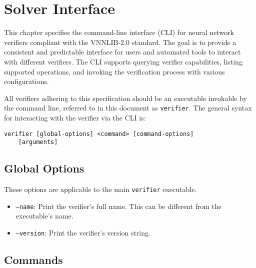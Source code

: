 
\chapter{Solver Interface}
\label{sec:solver_interface}

This chapter specifies the command-line interface (CLI) for neural network verifiers compliant with the VNNLIB-2.0 standard. The goal is to provide a consistent and 
predictable interface for users and automated tools to interact with different verifiers. The CLI supports querying verifier capabilities, listing supported operations, 
and invoking the verification process with various configurations.

All verifiers adhering to this specification should be an executable invokable by the command line, referred to in this document as \texttt{verifier}. The general syntax for interacting with the verifier via the CLI is:
\begin{lstlisting}[style=bash, numbers=none, frame=none, backgroundcolor=\color{white}]
verifier [global-options] <command> [command-options] 
	[arguments] 
\end{lstlisting}

\section{Global Options}
These options are applicable to the main \texttt{verifier} executable.
\begin{itemize}
    \item \texttt{--name}: Print the verifier's full name. This can be different from the executable's name.
    \item \texttt{--version}: Print the verifier's version string.
\end{itemize}

\section{Commands}


